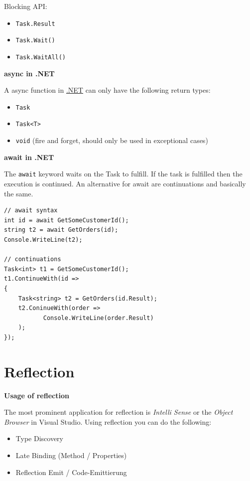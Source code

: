 \documentclass[11pt,twoside,landscape]{article}
\begin{document}
\begin{multicols}{3}
Blocking API:
\begin{itemize}
\item \texttt{Task.Result}
\item \texttt{Task.Wait()}
\item \texttt{Task.WaitAll()}
\end{itemize}


\textbf{async in .NET}

A async function in \href{../../../roam/20211003114703-net.org}{.NET} can only have the following return types:
\begin{itemize}
\item \texttt{Task}
\item \texttt{Task<T>}
\item \texttt{void} (fire and forget, should only be used in exceptional cases)
\end{itemize}


\textbf{await in .NET}

The \texttt{await} keyword waits on the Task to fulfill.
If the task is fulfilled then the execution is continued.
An alternative for await are continuations and basically the same.

\lstset{language=csharp,label= ,caption= ,captionpos=b,numbers=none}
\begin{lstlisting}
// await syntax
int id = await GetSomeCustomerId();
string t2 = await GetOrders(id);
Console.WriteLine(t2);

// continuations
Task<int> t1 = GetSomeCustomerId();
t1.ContinueWith(id =>
{
    Task<string> t2 = GetOrders(id.Result);
    t2.ConinueWith(order =>
		   Console.WriteLine(order.Result)
    );
});
\end{lstlisting}

\section{Reflection}
\label{sec:org85482dd}
\textbf{Usage of reflection}

The most prominent application for reflection is \emph{Intelli Sense} or the \emph{Object Browser} in Visual Studio.
Using reflection you can do the following:
\begin{itemize}
\item Type Discovery
\item Late Binding (Method / Properties)
\item Reflection Emit / Code-Emittierung
\end{itemize}



\end{multicols}
\end{document}
